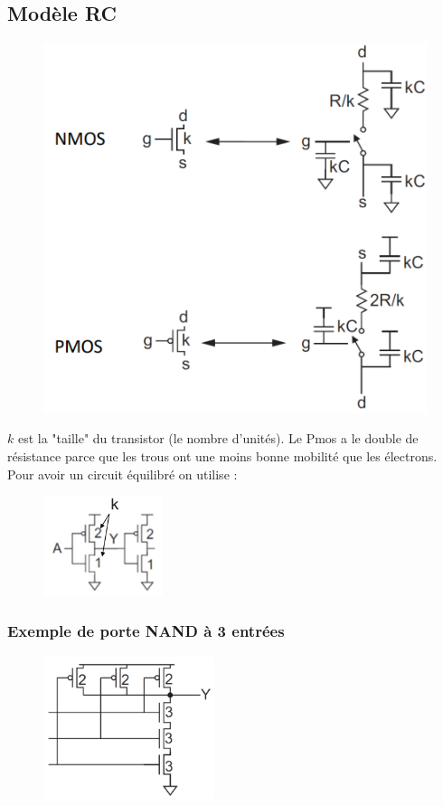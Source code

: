 \documentclass[resume]{subfiles}
\begin{document}
\begin{multicols}{3}
\subsection{Modèle RC}
\begin{figure}[H]
\centering
\includegraphics[width=\columnwidth]{img_40.png}
\end{figure}
$k$ est la "taille" du transistor (le nombre d'unités). Le Pmos a le double de résistance parce que les trous ont une moins bonne mobilité que les électrons. Pour avoir un circuit équilibré on utilise :
\begin{figure}[H]
\centering
\includegraphics[width=3.5cm]{img_41.png}
\end{figure}
\subsubsection{Exemple de porte NAND à 3 entrées}
\begin{figure}[H]
\centering
\includegraphics[width=5cm]{img_42.png}
\end{figure}


\end{multicols}
\end{document}
